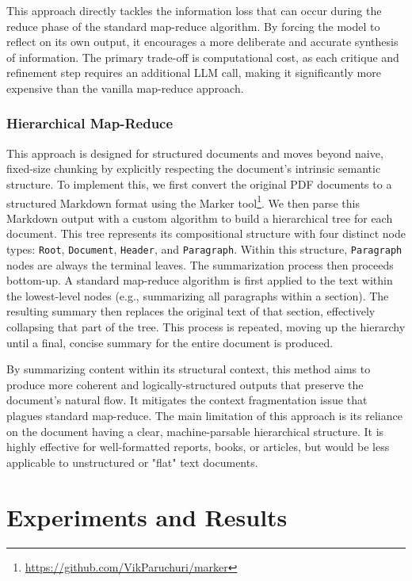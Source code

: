 \documentclass[11pt]{article}
\begin{document}
This approach directly tackles the information loss that can occur during the reduce phase of the standard map-reduce algorithm. By forcing the model to reflect on its own output, it encourages a more deliberate and accurate synthesis of information. The primary trade-off is computational cost, as each critique and refinement step requires an additional LLM call, making it significantly more expensive than the vanilla map-reduce approach.

\subsubsection{Hierarchical Map-Reduce}
This approach is designed for structured documents and moves beyond naive, fixed-size chunking by explicitly respecting the document's intrinsic semantic structure. To implement this, we first convert the original PDF documents to a structured Markdown format using the Marker tool\footnote{\url{https://github.com/VikParuchuri/marker}}. We then parse this Markdown output with a custom algorithm to build a hierarchical tree for each document. This tree represents its compositional structure with four distinct node types: \texttt{Root}, \texttt{Document}, \texttt{Header}, and \texttt{Paragraph}. Within this structure, \texttt{Paragraph} nodes are always the terminal leaves. The summarization process then proceeds bottom-up. A standard map-reduce algorithm is first applied to the text within the lowest-level nodes (e.g., summarizing all paragraphs within a section). The resulting summary then replaces the original text of that section, effectively collapsing that part of the tree. This process is repeated, moving up the hierarchy until a final, concise summary for the entire document is produced.

By summarizing content within its structural context, this method aims to produce more coherent and logically-structured outputs that preserve the document's natural flow. It mitigates the context fragmentation issue that plagues standard map-reduce. The main limitation of this approach is its reliance on the document having a clear, machine-parsable hierarchical structure. It is highly effective for well-formatted reports, books, or articles, but would be less applicable to unstructured or "flat" text documents.

\section{Experiments and Results}
\label{sec:experiments}
\end{document}
